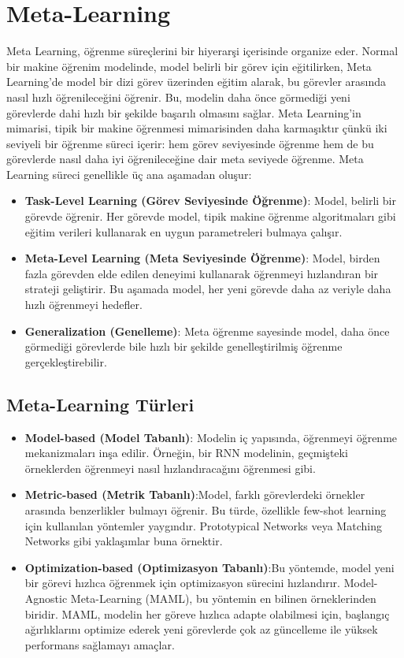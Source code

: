 \section{Meta-Learning}

Meta Learning, öğrenme süreçlerini bir hiyerarşi içerisinde organize eder. Normal bir makine öğrenim modelinde, model belirli bir görev için eğitilirken, Meta Learning'de model bir dizi görev üzerinden eğitim alarak, bu görevler arasında nasıl hızlı öğrenileceğini öğrenir. Bu, modelin daha önce görmediği yeni görevlerde dahi hızlı bir şekilde başarılı olmasını sağlar. Meta Learning'in mimarisi, tipik bir makine öğrenmesi mimarisinden daha karmaşıktır çünkü iki seviyeli bir öğrenme süreci içerir: hem görev seviyesinde öğrenme hem de bu görevlerde nasıl daha iyi öğrenileceğine dair meta seviyede öğrenme. Meta Learning süreci genellikle üç ana aşamadan oluşur:

\begin{itemize}
    \item \textbf{Task-Level Learning (Görev Seviyesinde Öğrenme)}: Model, belirli bir görevde öğrenir. Her görevde model, tipik makine öğrenme algoritmaları gibi eğitim verileri kullanarak en uygun parametreleri bulmaya çalışır.
    \item \textbf{Meta-Level Learning (Meta Seviyesinde Öğrenme)}: Model, birden fazla görevden elde edilen deneyimi kullanarak öğrenmeyi hızlandıran bir strateji geliştirir. Bu aşamada model, her yeni görevde daha az veriyle daha hızlı öğrenmeyi hedefler.
    \item \textbf{Generalization (Genelleme)}: Meta öğrenme sayesinde model, daha önce görmediği görevlerde bile hızlı bir şekilde genelleştirilmiş öğrenme gerçekleştirebilir.
\end{itemize}

\subsection{Meta-Learning Türleri}

\begin{itemize}
    \item \textbf{Model-based (Model Tabanlı)}: Modelin iç yapısında, öğrenmeyi öğrenme mekanizmaları inşa edilir. Örneğin, bir RNN modelinin, geçmişteki örneklerden öğrenmeyi nasıl hızlandıracağını öğrenmesi gibi.
    \item \textbf{Metric-based (Metrik Tabanlı)}:Model, farklı görevlerdeki örnekler arasında benzerlikler bulmayı öğrenir. Bu türde, özellikle few-shot learning için kullanılan yöntemler yaygındır. Prototypical Networks veya Matching Networks gibi yaklaşımlar buna örnektir.
    \item \textbf{Optimization-based (Optimizasyon Tabanlı)}:Bu yöntemde, model yeni bir görevi hızlıca öğrenmek için optimizasyon sürecini hızlandırır. Model-Agnostic Meta-Learning (MAML), bu yöntemin en bilinen örneklerinden biridir. MAML, modelin her göreve hızlıca adapte olabilmesi için, başlangıç ağırlıklarını optimize ederek yeni görevlerde çok az güncelleme ile yüksek performans sağlamayı amaçlar.
\end{itemize}

\newpage